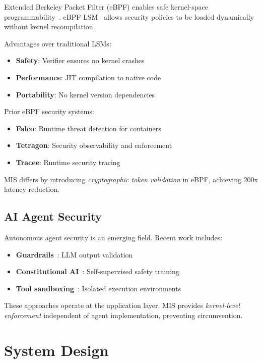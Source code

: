 \documentclass[11pt,a4paper]{article}
\begin{document}
Extended Berkeley Packet Filter (eBPF) enables safe kernel-space programmability~\cite{eBPF2014}. eBPF LSM~\cite{eBPF-LSM2020} allows security policies to be loaded dynamically without kernel recompilation.

Advantages over traditional LSMs:
\begin{itemize}
    \item \textbf{Safety}: Verifier ensures no kernel crashes
    \item \textbf{Performance}: JIT compilation to native code
    \item \textbf{Portability}: No kernel version dependencies
\end{itemize}

Prior eBPF security systems:
\begin{itemize}
    \item \textbf{Falco}: Runtime threat detection for containers
    \item \textbf{Tetragon}: Security observability and enforcement
    \item \textbf{Tracee}: Runtime security tracing
\end{itemize}

MIS differs by introducing \textit{cryptographic token validation} in eBPF, achieving 200x latency reduction.

\subsection{AI Agent Security}

Autonomous agent security is an emerging field. Recent work includes:

\begin{itemize}
    \item \textbf{Guardrails}~\cite{Guardrails2023}: LLM output validation
    \item \textbf{Constitutional AI}~\cite{Bai2022}: Self-supervised safety training
    \item \textbf{Tool sandboxing}~\cite{Schick2023}: Isolated execution environments
\end{itemize}

These approaches operate at the application layer. MIS provides \textit{kernel-level enforcement} independent of agent implementation, preventing circumvention.

\section{System Design}
\label{sec:design}
\end{document}
